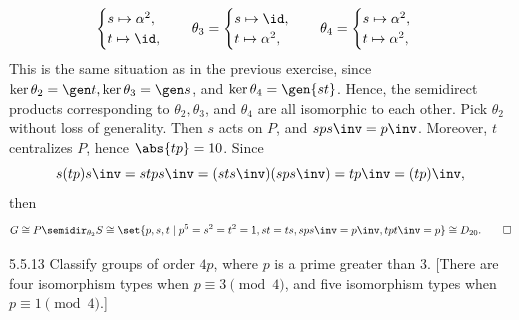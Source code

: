 \begin{sol}
\begin{itemize}
\[\begin{cases}
                s \mapsto \alpha^2, \\
                t \mapsto \id,
            \end{cases} \quad
            \theta_3 = 
            \begin{cases}
                s \mapsto \id, \\
                t \mapsto \alpha^2,
            \end{cases} \quad
            \theta_4 =
            \begin{cases}
                s \mapsto \alpha^2, \\
                t \mapsto \alpha^2,
            \end{cases}
        \]
        This is the same situation as in the previous exercise, since $\ker\theta_2 = \gen t, \ker\theta_3 = \gen s$, and $\ker\theta_4 = \gen{st}$.
        Hence, the semidirect products corresponding to $\theta_2, \theta_3$, and $\theta_4$ are all isomorphic to each other.
        Pick $\theta_2$ without loss of generality.
        Then $s$ acts on $P$, and $sps\inv = p\inv$.
        Moreover, $t$ centralizes $P$, hence $\abs{tp} = 10$.
        Since
        \[
        	s(tp)s\inv = stps\inv = (sts\inv)(sps\inv) = tp\inv = (tp)\inv,
        \]
        then
        \[
        	G \cong P \semidir_{\theta_2} S \cong \set{p, s, t \mid p^5 = s^2 = t^2 = 1, st = ts, sps\inv = p\inv, tpt\inv = p} \cong D_{20}. \qedhere
        \]
    \end{itemize}
\end{sol}

\begin{exercise}{5.5.13}
    Classify groups of order $4p$, where $p$ is a prime greater than 3. [There are four isomorphism types when $p \equiv 3 \pmod 4$, and five isomorphism types when $p \equiv 1 \pmod 4$.]
\end{exercise}


